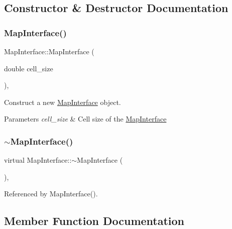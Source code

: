 \subsection{Constructor \& Destructor Documentation}
\mbox{\label{classMapInterface_a5ecababed14b4918ba90b98eb6b8f6b7}} 
\subsubsection{\texorpdfstring{Map\+Interface()}{MapInterface()}}
{\footnotesize\ttfamily Map\+Interface\+::\+Map\+Interface (\begin{DoxyParamCaption}\item[{double}]{cell\+\_\+size }\end{DoxyParamCaption})\hspace{0.3cm}{\ttfamily [inline]}, {\ttfamily [explicit]}}



Construct a new \hyperlink{classMapInterface}{Map\+Interface} object. 


\begin{DoxyParams}{Parameters}
{\em cell\+\_\+size} & Cell size of the \hyperlink{classMapInterface}{Map\+Interface} \\
\hline
\end{DoxyParams}
\mbox{\label{classMapInterface_aede896827e92298d459e6d51a2095155}} 
\subsubsection{\texorpdfstring{$\sim$\+Map\+Interface()}{~MapInterface()}}
{\footnotesize\ttfamily virtual Map\+Interface\+::$\sim$\+Map\+Interface (\begin{DoxyParamCaption}{ }\end{DoxyParamCaption})\hspace{0.3cm}{\ttfamily [virtual]}, {\ttfamily [default]}}



Referenced by Map\+Interface().



\subsection{Member Function Documentation}
\mbox{\label{classMapInterface_ade05de8aac815c4e54ffdbc82afa2cbc}} 
